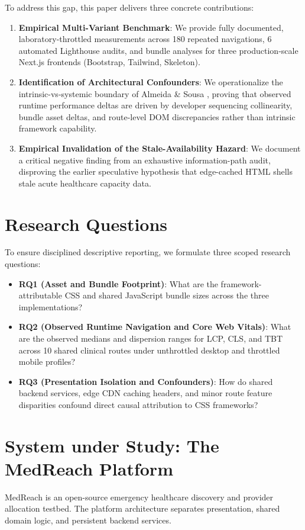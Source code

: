 \documentclass[conference]{IEEEtran}
\begin{document}
To address this gap, this paper delivers three concrete contributions:
\begin{enumerate}
    \item \textbf{Empirical Multi-Variant Benchmark}: We provide fully documented, laboratory-throttled measurements across 180 repeated navigations, 6 automated Lighthouse audits, and bundle analyses for three production-scale Next.js frontends (Bootstrap, Tailwind, Skeleton).
    \item \textbf{Identification of Architectural Confounders}: We operationalize the intrinsic-vs-systemic boundary of Almeida \& Sousa \cite{almeida2026security}, proving that observed runtime performance deltas are driven by developer sequencing collinearity, bundle asset deltas, and route-level DOM discrepancies rather than intrinsic framework capability.
    \item \textbf{Empirical Invalidation of the Stale-Availability Hazard}: We document a critical negative finding from an exhaustive information-path audit, disproving the earlier speculative hypothesis that edge-cached HTML shells stale acute healthcare capacity data.
\end{enumerate}

\section{Research Questions}
To ensure disciplined descriptive reporting, we formulate three scoped research questions:
\begin{itemize}
    \item \textbf{RQ1 (Asset and Bundle Footprint)}: What are the framework-attributable CSS and shared JavaScript bundle sizes across the three implementations?
    \item \textbf{RQ2 (Observed Runtime Navigation and Core Web Vitals)}: What are the observed medians and dispersion ranges for LCP, CLS, and TBT across 10 shared clinical routes under unthrottled desktop and throttled mobile profiles?
    \item \textbf{RQ3 (Presentation Isolation and Confounders)}: How do shared backend services, edge CDN caching headers, and minor route feature disparities confound direct causal attribution to CSS frameworks?
\end{itemize}

\section{System under Study: The MedReach Platform}
MedReach is an open-source emergency healthcare discovery and provider allocation testbed. The platform architecture separates presentation, shared domain logic, and persistent backend services.
\end{document}
